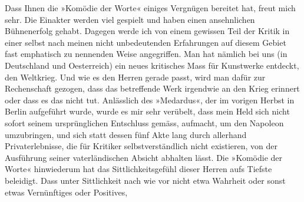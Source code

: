 \pstart
           {\pb}Dass Ihnen die »Komödie der Worte« einiges Vergnügen bereitet hat, freut mich sehr. Die
               Einakter werden viel gespielt und haben einen ansehnlichen Bühnenerfolg gehabt.
               Dagegen werde ich von einem gewissen Teil der Kritik in einer selbst nach meinen
               nicht unbedeutenden Erfahrungen auf diesem Gebiet fast emphatisch zu nennenden Weise
               angegriffen. Man hat nämlich bei uns (in Deutschland und Oesterreich) ein neues
               kritisches Mass für Kunstwerke entdeckt,  den
               Weltkrieg. Und wie es den Herren gerade passt, wird man dafür zur Rechenschaft
               gezogen, dass das betreffende Werk irgendwie an den Krieg erinnert oder dass es das
               nicht tut. Anlässlich des »Medardus«, der im
               vorigen Herbst in Berlin aufgeführt wurde, wurde
               es mir sehr verübelt, dass mein Held sich nicht sofort seinem ursprünglichen
               Entschluss gemäss, aufmacht, um den Napoleon
               umzubringen, und sich statt dessen fünf Akte lang durch allerhand Privaterlebnisse,
               die für Kritiker selbstverständlich {\pb}nicht
               existieren, von der Ausführung seiner vaterländischen Absicht abhalten lässt. Die
                  »Komödie der Worte« hinwiederum hat das
               Sittlichkeitsgefühl dieser Herren aufs Tiefste beleidigt. Dass unter Sittlichkeit
               nach wie vor nicht etwa Wahrheit oder sonst etwas Vernünftiges oder Positives,
